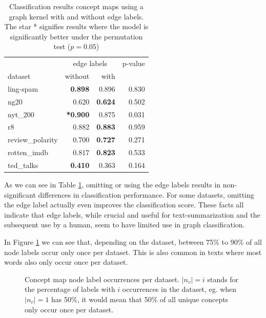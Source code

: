 \begin{table}[htb!]
	\centering
\begin{tabular}{lrrr}
	{} & \multicolumn{2}{c}{edge labels}  & p-value \\
	dataset & without & with \\
	\midrule
		ling-spam       & \textbf{0.898} & 0.896 & 0.830 \\
		ng20            & 0.620 & \textbf{0.624} & 0.502 \\
		nyt\_200         & \textbf{*0.900} & 0.875 & 0.031 \\
		r8              & 0.882 & \textbf{0.883} & 0.959 \\
		review\_polarity & 0.700 & \textbf{0.727} & 0.271 \\
		rotten\_imdb     & 0.817 & \textbf{0.823} & 0.533 \\
		ted\_talks       & \textbf{0.410} & 0.363 & 0.164 \\
	\bottomrule
\end{tabular}
\caption[Results: Graph Kernel with and without edge labels]{Classification results concept maps using a graph kernel with and without edge labels.  The star * signifies results where the model is significantly better under the permutation test ($p = 0.05$)}\label{table:edge_label_classification}
\end{table}

As we can see in Table \ref{table:edge_label_classification}, omitting or using the edge labels results in non-significant differences in classification performance.
For some datasets, omitting the edge label actually even improves the classification score.
These facts all indicate that edge labels, while crucial and useful for text-summarization and the subsequent use by a human, seem to have limited use in graph classification.


In Figure \ref{fig:percentage_distribution_concept_occurrences} we can see that, depending on the dataset, between 75\% to 90\% of all node labels occur only once per dataset.
This is also common in texts where most words also only occur once per dataset.
 
\begin{figure}[htb!]
	\caption[Statistics: Distribution concept occurrence]{Concept map node label occurrences per dataset. $|n_v| = i$ stands for the percentage of labels with $i$ occurrences in the dataset, eg. when $|n_v| = 1$ has 50\%, it would mean that 50\% of all unique concepts only occur once per dataset.}\label{fig:percentage_distribution_concept_occurrences}
\end{figure}

